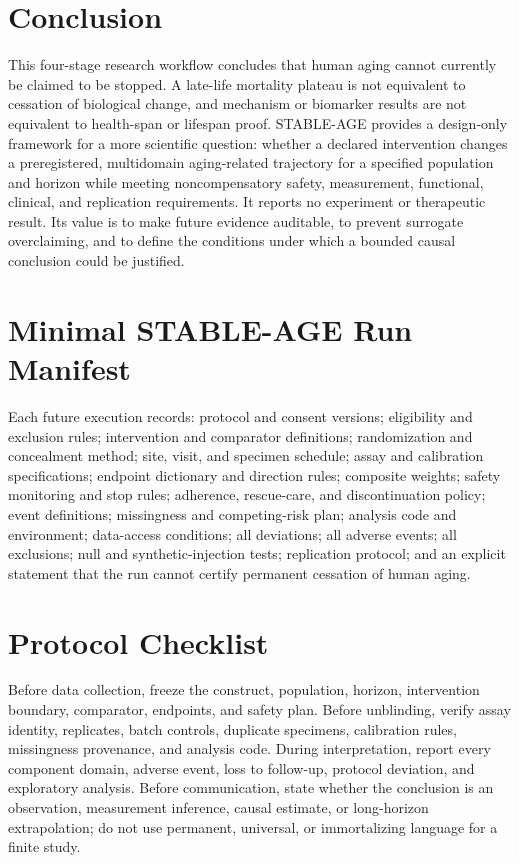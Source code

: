 \documentclass[10pt,conference]{IEEEtran}
\begin{document}
\section{Conclusion}
\label{sec:conclusion}

This four-stage research workflow concludes that human aging cannot currently be claimed to be stopped. A late-life mortality plateau is not equivalent to cessation of biological change, and mechanism or biomarker results are not equivalent to health-span or lifespan proof. STABLE-AGE provides a design-only framework for a more scientific question: whether a declared intervention changes a preregistered, multidomain aging-related trajectory for a specified population and horizon while meeting noncompensatory safety, measurement, functional, clinical, and replication requirements. It reports no experiment or therapeutic result. Its value is to make future evidence auditable, to prevent surrogate overclaiming, and to define the conditions under which a bounded causal conclusion could be justified.

\appendices
\section{Minimal STABLE-AGE Run Manifest}
\label{app:manifest}

Each future execution records: protocol and consent versions; eligibility and exclusion rules; intervention and comparator definitions; randomization and concealment method; site, visit, and specimen schedule; assay and calibration specifications; endpoint dictionary and direction rules; composite weights; safety monitoring and stop rules; adherence, rescue-care, and discontinuation policy; event definitions; missingness and competing-risk plan; analysis code and environment; data-access conditions; all deviations; all adverse events; all exclusions; null and synthetic-injection tests; replication protocol; and an explicit statement that the run cannot certify permanent cessation of human aging.

\section{Protocol Checklist}
\label{app:checklist}

Before data collection, freeze the construct, population, horizon, intervention boundary, comparator, endpoints, and safety plan. Before unblinding, verify assay identity, replicates, batch controls, duplicate specimens, calibration rules, missingness provenance, and analysis code. During interpretation, report every component domain, adverse event, loss to follow-up, protocol deviation, and exploratory analysis. Before communication, state whether the conclusion is an observation, measurement inference, causal estimate, or long-horizon extrapolation; do not use permanent, universal, or immortalizing language for a finite study.
\end{document}
